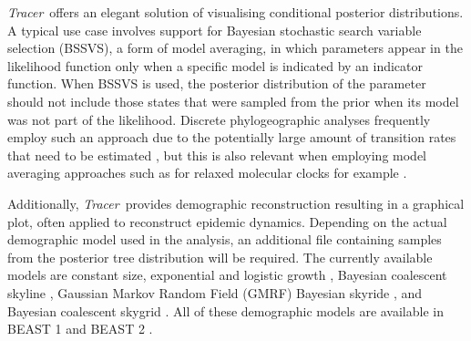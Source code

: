 \documentclass{bioinfo}
\newcommand{\tracer}{\emph{Tracer}}
\begin{document}
\tracer\ offers an elegant solution of visualising conditional posterior distributions.
A typical use case involves support for Bayesian stochastic search variable selection (BSSVS), a form of model averaging, in which parameters appear in the likelihood function only when a specific model is indicated by an indicator function.
When BSSVS is used, the posterior distribution of the parameter should not include those states that were sampled from the prior when its model was not part of the likelihood.
Discrete phylogeographic analyses frequently employ such an approach due to the potentially large amount of transition rates that need to be estimated \citep{Lemey2009}, but this is also relevant when employing model averaging approaches such as for relaxed molecular clocks for example \citep{Li2012}.

Additionally, \tracer\ provides demographic reconstruction resulting in a graphical plot, often applied to reconstruct epidemic dynamics.
Depending on the actual demographic model used in the analysis, an additional file containing samples from the posterior tree distribution will be required.
The currently available models are constant size, exponential and logistic growth \citep{drummond2002estimating}, Bayesian coalescent skyline \citep{drummond2005bayesian}, Gaussian Markov Random Field (GMRF) Bayesian skyride \citep{minin2008smooth}, and Bayesian coalescent skygrid \citep{gill2012improving}.
All of these demographic models are available in BEAST 1 \citep{drummond2012bayesian} and BEAST 2 \citep{bouckaert2014beast2}.
\end{document}
